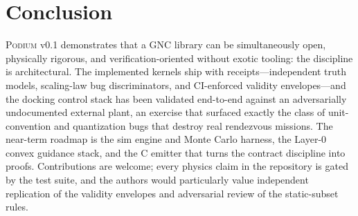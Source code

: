 \documentclass[11pt]{article}
\newcommand{\podium}{\textsc{Podium}}
\begin{document}
\section{Conclusion}

\podium{} v0.1 demonstrates that a GNC library can be simultaneously
open, physically rigorous, and verification-oriented without exotic
tooling: the discipline is architectural. The implemented kernels ship with
receipts---independent truth models, scaling-law bug discriminators, and
CI-enforced validity envelopes---and the docking control stack has been
validated end-to-end against an adversarially undocumented external plant,
an exercise that surfaced exactly the class of unit-convention and
quantization bugs that destroy real rendezvous missions. The near-term
roadmap is the sim engine and Monte Carlo harness, the Layer-0 convex
guidance stack, and the C emitter that turns the contract discipline into
proofs. Contributions are welcome; every physics claim in the repository is
gated by the test suite, and the authors would particularly value
independent replication of the validity envelopes and adversarial review of
the static-subset rules.



\end{document}
